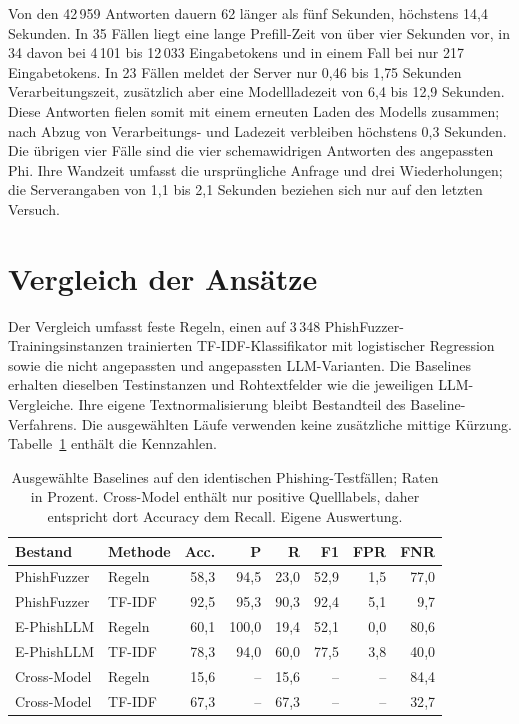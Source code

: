 \documentclass[12pt,twoside=false,a4paper,parskip]{scrbook}
\begin{document}
Von den 42\,959 Antworten dauern 62 länger als fünf Sekunden, höchstens 14{,}4 Sekunden. In 35 Fällen liegt eine lange Prefill-Zeit von über vier Sekunden vor, in 34 davon bei 4\,101 bis 12\,033 Eingabetokens und in einem Fall bei nur 217 Eingabetokens. In 23 Fällen meldet der Server nur 0{,}46 bis 1{,}75 Sekunden Verarbeitungszeit, zusätzlich aber eine Modellladezeit von 6{,}4 bis 12{,}9 Sekunden. Diese Antworten fielen somit mit einem erneuten Laden des Modells zusammen; nach Abzug von Verarbeitungs- und Ladezeit verbleiben höchstens 0{,}3 Sekunden. Die übrigen vier Fälle sind die vier schemawidrigen Antworten des angepassten Phi. Ihre Wandzeit umfasst die ursprüngliche Anfrage und drei Wiederholungen; die Serverangaben von 1{,}1 bis 2{,}1 Sekunden beziehen sich nur auf den letzten Versuch.

\section{Vergleich der Ansätze}\label{sec:vergleich}

Der Vergleich umfasst feste Regeln, einen auf 3\,348 PhishFuzzer-Trainingsinstanzen trainierten TF-IDF-Klassifikator mit logistischer Regression sowie die nicht angepassten und angepassten LLM-Varianten. Die Baselines erhalten dieselben Testinstanzen und Rohtextfelder wie die jeweiligen LLM-Vergleiche. Ihre eigene Textnormalisierung bleibt Bestandteil des Baseline-Verfahrens. Die ausgewählten Läufe verwenden keine zusätzliche mittige Kürzung. Tabelle~\ref{tab:baseline-resultate} enthält die Kennzahlen.

\begin{table}[htbp]
\centering\small
\caption{Ausgewählte Baselines auf den identischen Phishing-Testfällen; Raten in Prozent. Cross-Model enthält nur positive Quelllabels, daher entspricht dort Accuracy dem Recall. Eigene Auswertung.}
\label{tab:baseline-resultate}
\begin{tabular}{llrrrrrr}
\toprule
Bestand & Methode & Acc. & P & R & F1 & FPR & FNR \\
\midrule
PhishFuzzer & Regeln & 58{,}3 & 94{,}5 & 23{,}0 & 52{,}9 & 1{,}5 & 77{,}0 \\
PhishFuzzer & TF-IDF & 92{,}5 & 95{,}3 & 90{,}3 & 92{,}4 & 5{,}1 & 9{,}7 \\
E-PhishLLM & Regeln & 60{,}1 & 100{,}0 & 19{,}4 & 52{,}1 & 0{,}0 & 80{,}6 \\
E-PhishLLM & TF-IDF & 78{,}3 & 94{,}0 & 60{,}0 & 77{,}5 & 3{,}8 & 40{,}0 \\
Cross-Model & Regeln & 15{,}6 & -- & 15{,}6 & -- & -- & 84{,}4 \\
Cross-Model & TF-IDF & 67{,}3 & -- & 67{,}3 & -- & -- & 32{,}7 \\
\bottomrule
\end{tabular}
\end{table}
\end{document}
